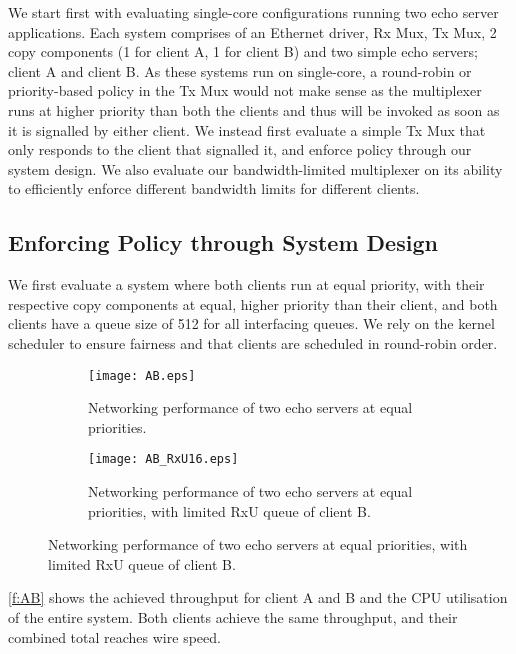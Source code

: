 We start first with evaluating single-core configurations running two echo server applications. 
Each system comprises of an Ethernet driver, Rx Mux, Tx Mux, 2 copy components (1 for client A, 1 for client B) 
and two simple echo servers; client A and client B. As these systems run on single-core, a round-robin or priority-based
policy in the Tx Mux would not make sense as the multiplexer runs at higher priority than both the clients and thus
will be invoked as soon as it is signalled by either client. We instead first evaluate a simple Tx Mux that only 
responds to the client that signalled it, and enforce policy through our system design. We also evaluate our
bandwidth-limited multiplexer on its ability to efficiently enforce different bandwidth limits for different clients.

\subsection{Enforcing Policy through System Design}
We first evaluate a system where both clients run at equal priority, with their respective copy components at 
equal, higher priority than their client, and both clients have a queue size of 512 for all interfacing queues.
We rely on the kernel scheduler to ensure fairness and that clients are scheduled in round-robin order.

\noindent\begin{figure}[H]
    \centering
	\begin{multicols}{2}
		\begin{subfigure}[b]{0.45\textwidth}
        \centering
        \texttt{[image: AB.eps]}
        \caption{Networking performance of two echo servers at equal priorities.}
        \label{f:AB}
    \end{subfigure}\qquad
    \begin{subfigure}[b]{0.45\textwidth}
        \centering
        \texttt{[image: AB\_RxU16.eps]}
        \caption{Networking performance of two echo servers at equal priorities, with limited RxU queue of client B.}
        \label{f:AB_Rx16}
    \end{subfigure}
\end{multicols}
\end{figure}

\autoref{f:AB} shows the achieved throughput for client A and B and the CPU utilisation of the entire system. 
Both clients achieve the same throughput, and their combined total reaches wire speed.\\

